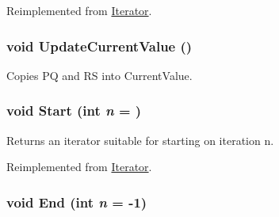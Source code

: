 Reimplemented from \hyperlink{classJKBuilder_1_1Iterator_a7874a07e98b52f4f147cde6f39353bae}{Iterator}.\hypertarget{classJKBuilder_1_1QuartetIterator_a1af5c865d6e9cfe63d0dedc53bdc13ba}{
\subsubsection[{UpdateCurrentValue}]{\setlength{\rightskip}{0pt plus 5cm}void UpdateCurrentValue ()}}
\label{classJKBuilder_1_1QuartetIterator_a1af5c865d6e9cfe63d0dedc53bdc13ba}


Copies PQ and RS into CurrentValue. \hypertarget{classJKBuilder_1_1QuartetIterator_a34ca36a99b20ae3170babadaffe51ed2}{
\subsubsection[{Start}]{\setlength{\rightskip}{0pt plus 5cm}void Start (int {\em n} = {})}}
\label{classJKBuilder_1_1QuartetIterator_a34ca36a99b20ae3170babadaffe51ed2}


Returns an iterator suitable for starting on iteration n. 

Reimplemented from \hyperlink{classJKBuilder_1_1Iterator_a34ca36a99b20ae3170babadaffe51ed2}{Iterator}.\hypertarget{classJKBuilder_1_1QuartetIterator_a5f692b73d2e160450f4617bb75825e11}{
\subsubsection[{End}]{\setlength{\rightskip}{0pt plus 5cm}void End (int {\em n} = {\ttfamily -\/1})}}
\label{classJKBuilder_1_1QuartetIterator_a5f692b73d2e160450f4617bb75825e11}


